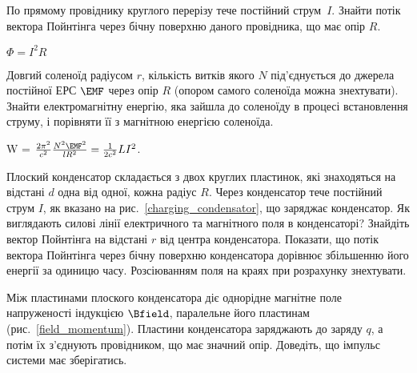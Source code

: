 \begin{problem}%
По прямому провіднику круглого перерізу тече постійний струм~$I$. Знайти потік вектора Пойнтінга через бічну поверхню даного провідника, що має опір $R$.
\begin{solution}
	$\Phi = I^2R$
\end{solution}
\end{problem}

\begin{problem}
    Довгий соленоїд радіусом $r$, кількість витків якого  $N$ під'єднується до джерела постійної ЕРС $\EMF$ через опір $R$ (опором самого соленоїда можна знехтувати). Знайти електромагнітну енергію, яка зайшла до соленоїду в процесі встановлення струму, і порівняти її з магнітною енергією соленоїда.
\begin{solution}
	W = $\frac{2\pi^2}{c^2} \frac{N^2\EMF^2}{lR^2} = \frac{1}{2c^2} LI^2$.
\end{solution}
\end{problem}

\begin{problem}\label{prb:charging_condensator}
Плоский конденсатор складається з двох круглих пластинок, які знаходяться на відстані $d$  одна від одної, кожна  радіус $R$. Через конденсатор тече постійний струм $I$, як вказано на рис.~\ref{charging_condensator}, що заряджає конденсатор. Як виглядають силові лінії електричного та магнітного поля в конденсаторі? Знайдіть вектор Пойнтінга на відстані $r$ від центра конденсатора. Показати, що потік вектора Пойнтінга через бічну поверхню конденсатора дорівнює збільшенню його енергії за одиницю часу. Розсіюванням поля на краях при розрахунку знехтувати.
\end{problem}

\begin{problem}\label{prb:field_momentum}
    Між пластинами плоского конденсатора діє однорідне магнітне поле напруженості індукцією $\Bfield$, паралельне його пластинам (рис.~\ref{field_momentum}). Пластини конденсатора заряджають до заряду $q$, а потім їх з'єднують провідником, що має значний опір. Доведіть, що імпульс системи має зберігатись.
\end{problem}

